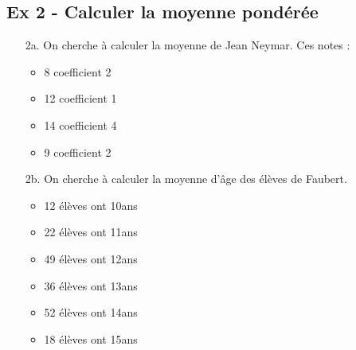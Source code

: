 \begin{multicols}{2}

  \subsection*{Ex 2 - Calculer la moyenne pondérée}

  \begin{enumerate}
  \item[2a.] On cherche à calculer la moyenne de Jean Neymar. Ces notes :\\
  \begin{itemize}[label={$\bullet$}]
    \item 8 coefficient 2
    \item 12 coefficient 1
    \item 14 coefficient 4
    \item 9 coefficient 2
\end{itemize} 

  \item[2b.]  On cherche à calculer la moyenne d'âge des élèves de Faubert. \\
  \begin{itemize}[label={$\bullet$}]
    \item 12 élèves ont 10ans
    \item 22 élèves ont 11ans
    \item 49 élèves ont 12ans
    \item 36 élèves ont 13ans
    \item 52 élèves ont 14ans
    \item 18 élèves ont 15ans
\end{itemize} 
\end{enumerate} 

\columnbreak

\Pointilles[26]

\end{multicols}

\newpage

